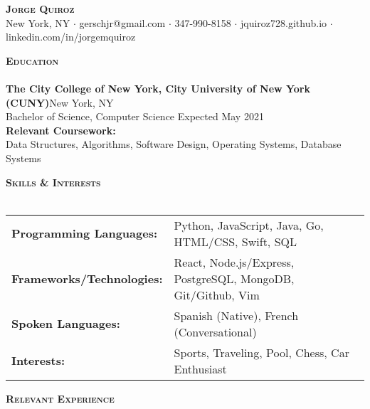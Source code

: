 \documentclass[a4paper]{article}
\newcommand{\lineunder} {
    \vspace*{-8pt} \\
    \hspace*{-18pt} \hrulefill \\
}
\newcommand{\header} [1] {
    {\hspace*{-18pt}\vspace*{6pt} \textsc{#1}}
    \vspace*{-6pt} \lineunder
}
\begin{document}
\vspace*{-40pt}

    

\vspace*{-20pt}
\begin{center}
	{\Huge \scshape {\textbf{Jorge Quiroz}}}\\
    \vspace{1mm}
	New York, NY $\cdot$ gerschjr@gmail.com $\cdot$ 347-990-8158 $\cdot$ jquiroz728.github.io $\cdot$ linkedin.com/in/jorgemquiroz\\
\end{center}

\header{\textbf{Education}}
\textbf{The City College of New York, City University of New York (CUNY)}\hfill New York, NY\\
Bachelor of Science, Computer Science \hfill  Expected May 2021\\
\textbf{Relevant Coursework:} \\
Data Structures, Algorithms, Software Design, Operating Systems, Database Systems
\vspace{2mm}

\header{\textbf{Skills \& Interests}}
\vspace{1mm}
\begin{tabular}{ l l }
	\textbf{Programming Languages:}   & Python, JavaScript, Java, Go, HTML/CSS, Swift, SQL                  \\
	\textbf{Frameworks/Technologies:} & React, Node.js/Express, PostgreSQL, MongoDB, Git/Github, Vim \\
	\textbf{Spoken Languages:}        & Spanish (Native), French (Conversational)                    \\
	\textbf{Interests:}               & Sports, Traveling, Pool, Chess, Car Enthusiast           \\
\end{tabular}
\vspace{2mm}

\header{\textbf{Relevant Experience}}
\vspace{1mm}
\end{document}
